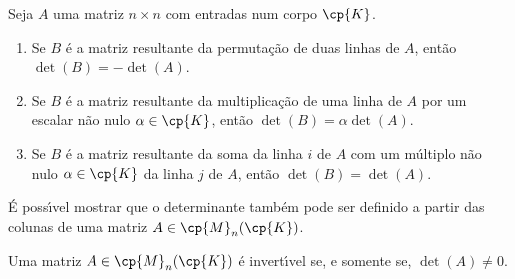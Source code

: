 \begin{proposicao}
	Seja $A$ uma matriz $n \times n$ com entradas num corpo $\cp{K}$.
	\begin{enumerate}[label={\roman*})]
		\item Se $B$ é a matriz resultante da permutação de duas linhas de $A$, então $\det (B) = -\det (A)$.
		\item Se $B$ é a matriz resultante da multiplicação de uma linha de $A$ por um escalar não nulo $\alpha \in \cp{K}$, então $\det(B) = \alpha\det(A)$.
		\item Se $B$ é a matriz resultante da soma da linha $i$ de $A$ com um m\'ultiplo não nulo $\alpha \in \cp{K}$ da linha $j$ de $A$, então $\det(B) = \det(A)$.
	\end{enumerate}
\end{proposicao}

\begin{observacao}
	\'E poss{\'\i}vel mostrar que o determinante também pode ser definido a partir das colunas de uma matriz $A \in \cp{M}_n(\cp{K})$.
\end{observacao}

\begin{teorema}
	Uma matriz $A \in \cp{M}_n(\cp{K})$ é invert{\'\i}vel se, e somente se, $\det(A) \ne 0$.
\end{teorema}

